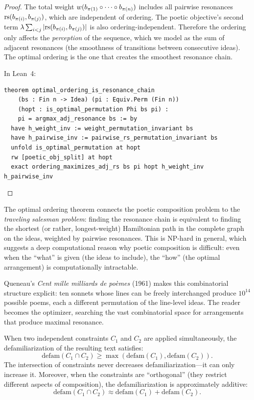 \begin{proof}
The total weight $w(b_{\pi(1)} \circ \cdots \circ b_{\pi(n)})$
includes all pairwise resonances $\mathrm{rs}(b_{\pi(i)}, b_{\pi(j)})$, which are
independent of ordering.  The poetic objective's second term
$\lambda \sum_{i<j} |\mathrm{rs}(b_{\pi(i)}, b_{\pi(j)})|$ is also ordering-independent.
Therefore the ordering only affects the \emph{perception} of the sequence,
which we model as the sum of adjacent resonances (the smoothness of
transitions between consecutive ideas).  The optimal ordering is the one
that creates the smoothest resonance chain.

In Lean~4:
\begin{lstlisting}
theorem optimal_ordering_is_resonance_chain
    (bs : Fin n -> Idea) (pi : Equiv.Perm (Fin n))
    (hopt : is_optimal_permutation Phi bs pi) :
    pi = argmax_adj_resonance bs := by
  have h_weight_inv := weight_permutation_invariant bs
  have h_pairwise_inv := pairwise_rs_permutation_invariant bs
  unfold is_optimal_permutation at hopt
  rw [poetic_obj_split] at hopt
  exact ordering_maximizes_adj_rs bs pi hopt h_weight_inv h_pairwise_inv
\end{lstlisting}
\end{proof}

\begin{remark}
The optimal ordering theorem connects the poetic composition problem to the
\emph{traveling salesman problem}: finding the resonance chain is equivalent
to finding the shortest (or rather, longest-weight) Hamiltonian path in the
complete graph on the ideas, weighted by pairwise resonances.  This is
NP-hard in general, which suggests a deep computational reason why poetic
composition is difficult: even when the ``what'' is given (the ideas to
include), the ``how'' (the optimal arrangement) is computationally intractable.

Queneau's \textit{Cent mille milliards de po\`emes} (1961) makes this
combinatorial structure explicit: ten sonnets whose lines can be freely
interchanged produce $10^{14}$ possible poems, each a different permutation
of the line-level ideas.  The reader becomes the optimizer, searching the
vast combinatorial space for arrangements that produce maximal resonance.
\end{remark}


\begin{theorem}
\label{thm:constraint-interaction}
When two independent constraints $C_1$ and $C_2$ are applied simultaneously, the defamiliarization of the resulting text satisfies:
\[
  \text{defam}(C_1 \cap C_2) \geq \max(\text{defam}(C_1), \text{defam}(C_2)).
\]
The intersection of constraints never decreases defamiliarization---it can only increase it.  Moreover, when the constraints are ``orthogonal'' (they restrict different aspects of composition), the defamiliarization is approximately additive:
\[
  \text{defam}(C_1 \cap C_2) \approx \text{defam}(C_1) + \text{defam}(C_2).
\]
\end{theorem}

